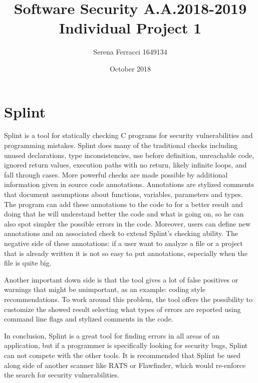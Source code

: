 \documentclass[a4paper]{article}
\title{\vspace{-2.0cm}Software Security A.A.2018-2019\\
Individual Project 1}
\author{Serena Ferracci 1649134}
\date{October 2018}
\begin{document}
\maketitle
\section*{Splint}
Splint is a tool for statically checking C programs for security vulnerabilities 
and programming mistakes.  Splint does many of the traditional checks 
including unused declarations, type inconsistencies, use before definition, 
unreachable code, ignored return values, execution paths with no return, likely 
infinite loops, and fall through cases.  More powerful checks are made possible 
by additional information given in source code annotations.  Annotations are 
stylized comments that document assumptions about functions, variables, 
parameters and types.  
The program can add these annotations to the code to for a better result and doing that he will understand
better the code and what is going on, so he can also spot simpler the possible errors in the code.
Moreover, users can define new annotations and an associated check to extend Splint’s checking ability.
The negative side of these annotations: if a user want to analyze a file or a project that is already written
it is not so easy to put annotations, especially
when the file is quite big.

Another important down side is that the tool gives a lot of false positives or warnings 
that might be unimportant, as an example: coding style recommendations. 
To work around this problem, the tool offers the possibility 
to customize the showed result selecting what types of errors are reported using 
command line flags and stylized comments in the code.

In conclusion, Splint is a great tool for finding errors in all areas of an application, but if a
programmer is specifically looking for security bugs, Splint can not compete with
the other tools. It is recommended that
Splint be used along side of another scanner like RATS or Flawfinder, which
would re-enforce the search for security vulnerabilities.
\end{document}

